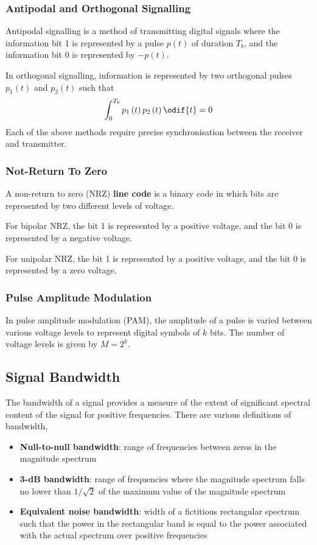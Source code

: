 \documentclass{article}
\begin{document}
\subsubsection{Antipodal and Orthogonal Signalling}
Antipodal signalling is a method of transmitting digital signals where
the information bit 1 is represented by a pulse \(p\left( t \right)\)
of duration \(T_b\), and the information bit 0 is represented by
\(-p\left( t \right)\).

In orthogonal signalling, information is represented by two orthogonal
pulses \(p_1\left( t \right)\) and \(p_2\left( t \right)\) such that
\begin{equation*}
    \int_{0}^{T_b} p_1\left( t \right) p_2\left( t \right) \odif{t} = 0
\end{equation*}
Each of the above methods require precise synchronisation between the
receiver and transmitter.
\subsubsection{Not-Return To Zero}
A non-return to zero (NRZ) \textbf{line code} is a binary code in which
bits are represented by two different levels of voltage.

For bipolar NRZ, the bit 1 is represented by a positive voltage, and
the bit 0 is represented by a negative voltage.

For unipolar NRZ, the bit 1 is represented by a positive voltage, and
the bit 0 is represented by a zero voltage.
\subsubsection{Pulse Amplitude Modulation}
In pulse amplitude modulation (PAM), the amplitude of a pulse is varied
between various voltage levels to represent digital symbols of \(k\)
bits. The number of voltage levels is given by \(M = 2^k\).
\subsection{Signal Bandwidth}
The bandwidth of a signal provides a measure of the extent of
significant spectral content of the signal for positive frequencies.
There are various definitions of bandwidth,
\begin{itemize}
    \item \textbf{Null-to-null bandwidth}: range of frequencies between
          zeros in the magnitude spectrum
    \item \textbf{3-dB bandwidth}: range of frequencies where the
          magnitude spectrum falls no lower than \(1/\sqrt{2}\) of the
          maximum value of the magnitude spectrum
    \item \textbf{Equivalent noise bandwidth}: width of a fictitious
          rectangular spectrum such that the power in the rectangular
          band is equal to the power associated with the actual
          spectrum over positive frequencies
\end{itemize}
\end{document}
